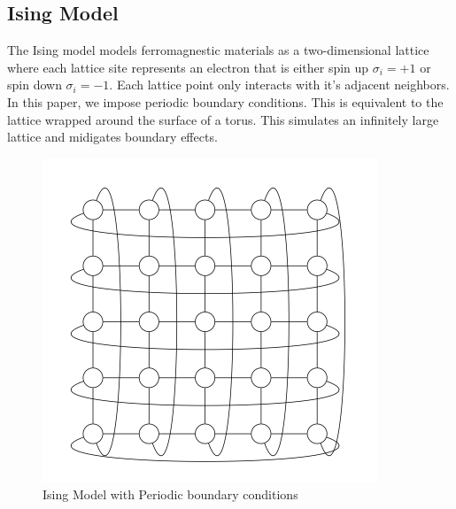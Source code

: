 \documentclass{article}
\begin{document}
    \subsection{Ising Model}
    The Ising model models ferromagnestic materials as a two-dimensional lattice where each lattice site represents an 
    electron that is either spin up $\sigma_i = +1$ or spin down $\sigma_i = -1$. Each lattice point only interacts
    with it's adjacent neighbors. In this paper, we impose periodic boundary conditions. This is equivalent to the lattice wrapped around the surface of a torus. This simulates 
    an infinitely large lattice and midigates boundary effects. 
    
    \begin{figure}[ht]
        \includegraphics[width=\columnwidth]{diagrams/loopy_ising_model.png}
        \caption{Ising Model with Periodic boundary conditions}
        \label{fig:1}
    \end{figure}
    
\end{document}
